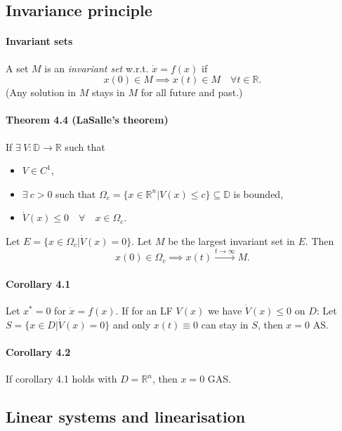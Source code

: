\subsection{Invariance principle}
\paragraph{Invariant sets} A set $M$ is an \emph{invariant set} w.r.t. $\dot{x} = f(x)$ if
\begin{equation}
	x(0) \in M \implies x(t) \in M \quad \forall t \in \mathbb{R}.
\end{equation}
(Any solution in $M$ stays in $M$ for all future and past.)

\paragraph{Theorem 4.4 (LaSalle's theorem)}
If $\exists \: V : \mathbb{D} \to \mathbb{R}$ such that
\begin{itemize}
	\item $V \in C^1$,
	\item $\exists \: c > 0$ such that $\Omega_c = \{x \in \mathbb{R}^n | V(x) \leq c \} \subseteq \mathbb{D}$ is bounded,
	\item $\dot{V}(x) \leq 0 \quad \forall \quad x \in \Omega_c$.
\end{itemize}
Let $E = \{ x \in \Omega_c | \dot{V}(x) = 0 \}$. Let $M$ be the largest invariant set in $E$. Then
\begin{equation}
	x(0) \in \Omega_c \implies x(t) \xrightarrow{t \to \infty} M.
\end{equation}

\paragraph{Corollary 4.1} Let $x^* = 0$ for $\dot{x} = f(x)$. If for an LF $V(x)$ we have $\dot{V}(x) \leq 0$ on $D$: Let $S = \{ x \in D | \dot{V}(x) = 0 \}$ and only $x(t) \equiv 0$ can stay in $S$, then $x = 0$ AS.

\paragraph{Corollary 4.2} If corollary 4.1 holds with $D = \mathbb{R}^n$, then $x = 0$ GAS.

\subsection{Linear systems and linearisation}

